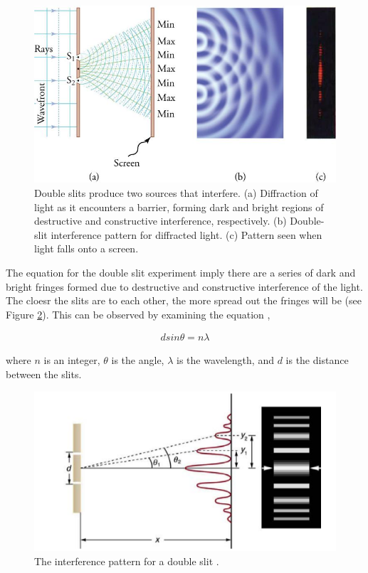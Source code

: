 \documentclass[12pt]{article}
\begin{document}
\begin{figure}[H]
    \centering
    \includegraphics[width=.7\textwidth]{diffraction pattern.jpg}
    \caption{ Double slits produce two sources that interfere. (a) Diffraction of light as it encounters a barrier, forming dark and bright regions of destructive and constructive interference, respectively.
    (b) Double-slit interference pattern for diffracted light. (c) Pattern seen when light falls onto a screen. \protect\cite{urone2012collegedouble}}
    \label{fig:1}
\end{figure}

The equation for the double slit experiment imply there are a series of dark and bright fringes formed due to destructive and constructive interference of the light. The cloesr the slits are to each other, the more spread out the fringes will be (see Figure \ref{fig:3}).
This can be observed by examining the equation \cite{urone2012collegedouble},

\vspace{-2ex}
\begin{gather}
    d sin \theta = n \lambda
\end{gather}

where $n$ is an integer, $\theta$ is the angle, $\lambda$ is the wavelength, and $d$ is the distance between the slits.

\begin{figure}[H]
    \centering
    \includegraphics[width=.7\textwidth]{youngs slit.png}
    \caption{\centering The interference pattern for a double slit \protect\cite{urone2012collegedouble}.}
    \label{fig:3}
\end{figure}
\end{document}
